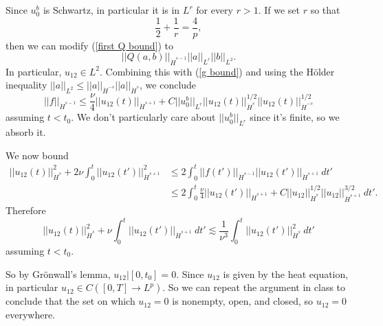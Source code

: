 \documentclass[10pt]{article}
\theoremstyle{definition}
\begin{document}
Since $u_0^b$ is Schwartz, in particular it is in $L^r$ for every $r > 1$.
If we set $r$ so that
$$\frac{1}{2} + \frac{1}{r} = \frac{4}{p},$$
then we can modify (\ref{first Q bound}) to
$$||Q(a, b)||_{\dot H^{s-1}} ||a||_{L^r} ||b||_{L^2}.$$
In particular, $u_{12} \in L^2$.
Combining this with (\ref{g bound}) and using the H\"older inequality $||a||_{L^2} \leq ||a||_{\dot H^{-s}} ||a||_{\dot H^s}$, we conclude
$$||f||_{\dot H^{s - 1}} \leq \frac{\nu}{4} ||u_{12}(t)||_{\dot H^{s + 1}} + C||u_0^b||_{L^r}||u_{12}(t)||_{\dot H^s}^{1/2} ||u_{12}(t)||_{\dot H^{-s}}^{1/2}$$
assuming $t < t_0$.
We don't particularly care about $||u_0^b||_{L^r}$ since it's finite, so we absorb it.

We now bound
\begin{align*}
||u_{12}(t)||_{\dot H^s}^2 + 2\nu\int_0^t ||u_{12}(t')||_{\dot H^{s+1}}^2 &\leq 2 \int_0^t ||f(t')||_{\dot H^{s-1}} ||u_{12}(t')||_{\dot H^{s+1}} ~dt'\\
&\leq 2\int_0^t \frac{\nu}{4} ||u_{12}(t')||_{\dot H^{s+1}} + C||u_{12}||_{\dot H^s}^{1/2} ||u_{12}||_{\dot H^{s+1}}^{3/2} ~dt'.
\end{align*}
Therefore
$$||u_{12}(t)||_{\dot H^s}^2 + \nu \int_0^t ||u_{12}(t')||_{\dot H^{s+1}} ~dt' \lesssim \frac{1}{\nu^3} \int_0^t ||u_{12}(t')||_{\dot H^s}^2 ~dt'$$
assuming $t < t_0$.

So by Gr\"onwall's lemma, $u_{12}|[0, t_0] = 0$.
Since $u_{12}$ is given by the heat equation, in particular $u_{12} \in C([0, T] \to L^p)$.
So we can repeat the argument in class to conclude that the set on which $u_{12} = 0$ is nonempty, open, and closed, so $u_{12} = 0$ everywhere.
\end{document}
